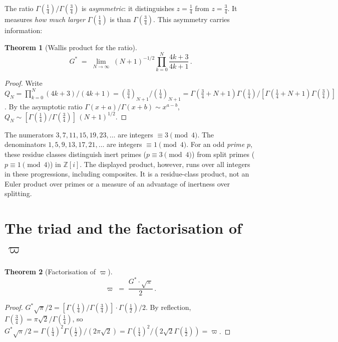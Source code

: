 \documentclass[12pt,reqno]{amsart}
\newtheorem{theorem}{Theorem}[section]
\theoremstyle{definition}
\theoremstyle{remark}
\newcommand{\ZZ}{\mathbb{Z}}
\newcommand{\Gstar}{G^{\!*}}
\newcommand{\varpiup}{\varpi}
\begin{document}
The ratio $\Gamma(\tfrac14)/\Gamma(\tfrac34)$ is \emph{asymmetric}: it
distinguishes $z=\tfrac14$ from $z=\tfrac34$.  It measures \emph{how much
larger} $\Gamma(\tfrac14)$ is than $\Gamma(\tfrac34)$.  This asymmetry
carries information:

\begin{theorem}[Wallis product for the ratio]\label{thm:wallis}
\begin{equation}\label{eq:wallis-ratio}
  {\Gstar} \;=\; \lim_{N\to\infty}\;(N+1)^{-1/2}
  \prod_{k=0}^{N}\frac{4k+3}{4k+1}\,.
\end{equation}
\end{theorem}

\begin{proof}
Write $Q_{N} = \prod_{k=0}^{N}(4k+3)/(4k+1)
= (\tfrac34)_{N+1}/(\tfrac14)_{N+1}
= \Gamma(\tfrac34+N+1)\Gamma(\tfrac14)/
[\Gamma(\tfrac14+N+1)\Gamma(\tfrac34)]$.
By the asymptotic ratio $\Gamma(x+a)/\Gamma(x+b)\sim x^{a-b}$,
$Q_{N}\sim [\Gamma(\tfrac14)/\Gamma(\tfrac34)]\,(N+1)^{1/2}$.
\end{proof}

The numerators $3, 7, 11, 15, 19, 23, \ldots$ are integers
$\equiv 3\pmod{4}$.  The denominators $1, 5, 9, 13, 17, 21, \ldots$
are integers $\equiv 1\pmod{4}$. For an odd \emph{prime} $p$, these
residue classes distinguish inert primes ($p\equiv3\pmod4$) from
split primes ($p\equiv1\pmod4$) in $\ZZ[i]$. The displayed product,
however, runs over all integers in these progressions, including
composites. It is a residue-class product, not an Euler product over
primes or a measure of an advantage of inertness over splitting.


\section{The triad and the factorisation of \texorpdfstring{$\varpiup$}{varpi}}

\begin{theorem}[Factorisation of $\varpiup$]\label{thm:factor}
\begin{equation}\label{eq:factor}
  \varpiup \;=\; \frac{{\Gstar}\cdot\sqrt{\pi}}{2}\,.
\end{equation}
\end{theorem}

\begin{proof}
$\Gstar\sqrt{\pi}/2
= [\Gamma(\tfrac14)/\Gamma(\tfrac34)]\cdot\Gamma(\tfrac12)/2$.
By reflection, $\Gamma(\tfrac34)=\pi\sqrt{2}/\Gamma(\tfrac14)$, so
$\Gstar\sqrt{\pi}/2
= \Gamma(\tfrac14)^{2}\Gamma(\tfrac12)/(2\pi\sqrt{2})
= \Gamma(\tfrac14)^{2}/(2\sqrt{2}\Gamma(\tfrac12)) = \varpiup$.
\end{proof}
\end{document}
